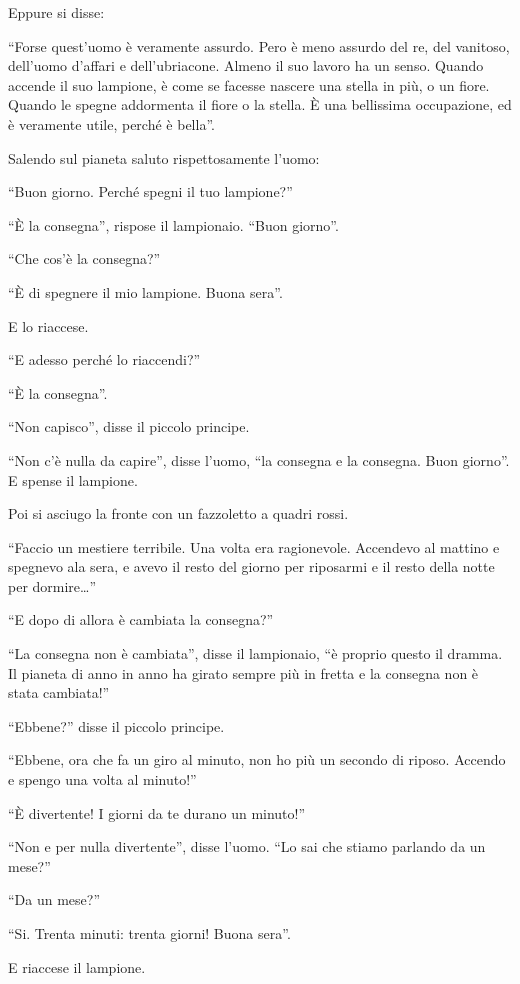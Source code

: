 \documentclass[11pt]{scrbook}
\begin{document}
Eppure si disse:

``Forse quest'uomo è veramente assurdo. Pero è meno assurdo del re, del
vanitoso, dell'uomo d'affari e dell'ubriacone. Almeno il suo lavoro ha
un senso. Quando accende il suo lampione, è come se facesse nascere una
stella in più, o un fiore. Quando le spegne addormenta il fiore o la
stella. È una bellissima occupazione, ed è veramente utile, perché è
bella''.

Salendo sul pianeta saluto rispettosamente l'uomo:

``Buon giorno. Perché spegni il tuo lampione?''

``È la consegna'', rispose il lampionaio. ``Buon giorno''.

``Che cos'è la consegna?''

``È di spegnere il mio lampione. Buona sera''.

E lo riaccese.

``E adesso perché lo riaccendi?''

``È la consegna''.

``Non capisco'', disse il piccolo principe.

``Non c'è nulla da capire'', disse l'uomo, ``la consegna e la consegna.
Buon giorno''. E spense il lampione.

Poi si asciugo la fronte con un fazzoletto a quadri rossi.

``Faccio un mestiere terribile. Una volta era ragionevole. Accendevo al
mattino e spegnevo ala sera, e avevo il resto del giorno per riposarmi e
il resto della notte per dormire\ldots{}''

``E dopo di allora è cambiata la consegna?''

``La consegna non è cambiata'', disse il lampionaio, ``è proprio questo
il dramma. Il pianeta di anno in anno ha girato sempre più in fretta e
la consegna non è stata cambiata!''

``Ebbene?'' disse il piccolo principe.

``Ebbene, ora che fa un giro al minuto, non ho più un secondo di riposo.
Accendo e spengo una volta al minuto!''

``È divertente! I giorni da te durano un minuto!''

``Non e per nulla divertente'', disse l'uomo. ``Lo sai che stiamo
parlando da un mese?''

``Da un mese?''

``Si. Trenta minuti: trenta giorni! Buona sera''.

E riaccese il lampione.
\end{document}
